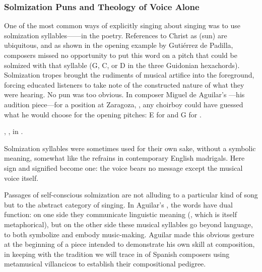 \subsubsection{Solmization Puns and Theology of Voice Alone}

One of the most common ways of explicitly singing about singing was to use
solmization syllables------in the poetry.
References to Christ as  (sun) are ubiquitous, and as shown in the
opening example by Gutiérrez de Padilla, composers missed no opportunity to put
this word on a pitch that could be solmized with that syllable (G, C, or D in
the three Guidonian hexachords).
Solmization tropes brought the rudiments of musical artifice into the
foreground, forcing educated listeners to take note of the constructed nature
of what they were hearing.
No pun was too obvious.
In composer Miguel de Aguilar's ---his audition piece---for a
position at Zaragoza, , any choirboy could have
guessed what he would choose for the opening pitches: E for  and G for
.%
\begin{Footnote}
    , , 
    in \autocite[34--64]{Ezquerro:MME55}. 
\end{Footnote}
Solmization syllables were sometimes used for their own sake, without a
symbolic meaning, somewhat like the  refrains in contemporary
English madrigals.
Here sign and signified become one: the voice bears no message except the
musical voice itself.


Passages of self-conscious solmization are not alluding to a particular kind of
song but to the abstract category of singing.
In Aguilar's , the words have dual function: on one side
they communicate linguistic meaning (, which is itself
metaphorical), but on the other side these musical syllables go beyond
language, to both symbolize and embody music-making. 
Aguilar made this obvious gesture at the beginning of a piece intended to
demonstrate his own skill at composition, in keeping with the tradition we will
trace in  of Spanish composers using metamusical
villancicos to establish their compositional pedigree.


